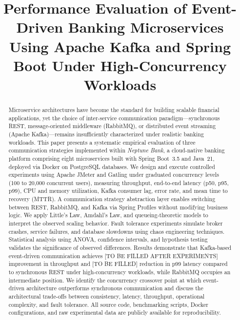 \documentclass[journal]{IEEEtran}
\begin{document}
\title{Performance Evaluation of Event-Driven Banking Microservices Using Apache Kafka and Spring Boot Under High-Concurrency Workloads}

\author{
}

\maketitle

\begin{abstract}
Microservice architectures have become the standard for building scalable financial applications, yet the choice of inter-service communication paradigm---synchronous REST, message-oriented middleware (RabbitMQ), or distributed event streaming (Apache Kafka)---remains insufficiently characterized under realistic banking workloads. This paper presents a systematic empirical evaluation of three communication strategies implemented within \textit{Neptune Bank}, a cloud-native banking platform comprising eight microservices built with Spring Boot~3.5 and Java~21, deployed via Docker on PostgreSQL databases. We design and execute controlled experiments using Apache JMeter and Gatling under graduated concurrency levels (100 to 20,000 concurrent users), measuring throughput, end-to-end latency (p50, p95, p99), CPU and memory utilization, Kafka consumer lag, error rate, and mean time to recovery (MTTR). A communication strategy abstraction layer enables switching between REST, RabbitMQ, and Kafka via Spring Profiles without modifying business logic. We apply Little's Law, Amdahl's Law, and queueing-theoretic models to interpret the observed scaling behavior. Fault tolerance experiments simulate broker crashes, service failures, and database slowdowns using chaos engineering techniques. Statistical analysis using ANOVA, confidence intervals, and hypothesis testing validates the significance of observed differences. Results demonstrate that Kafka-based event-driven communication achieves [TO BE FILLED AFTER EXPERIMENTS] improvement in throughput and [TO BE FILLED] reduction in p99 latency compared to synchronous REST under high-concurrency workloads, while RabbitMQ occupies an intermediate position. We identify the concurrency crossover point at which event-driven architecture outperforms synchronous communication and discuss the architectural trade-offs between consistency, latency, throughput, operational complexity, and fault tolerance. All source code, benchmarking scripts, Docker configurations, and raw experimental data are publicly available for reproducibility.
\end{abstract}
\end{document}
